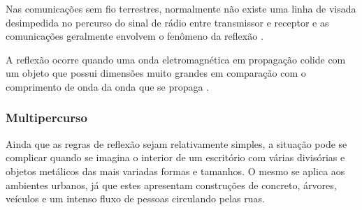 Nas comunicações sem fio terrestres, normalmente não existe uma linha de visada desimpedida no percurso do sinal de rádio entre transmissor e receptor e as comunicações geralmente envolvem o fenômeno da reflexão \cite{haykin2008}.

\begin{citacao}
	A reflexão ocorre quando uma onda eletromagnética em propagação colide com um objeto que possui dimensões muito grandes em comparação com o comprimento de onda da onda que se propaga  \cite{rappaport2009}.
\end{citacao}

\begin{figure}[H]
	\centering
\end{figure}

\subsubsection{Multipercurso}
\label{subsec:multipercurso}

Ainda que as regras de reflexão sejam relativamente simples, a situação pode se complicar quando se imagina o interior de um escritório com várias divisórias e objetos metálicos das mais variadas formas e tamanhos. O mesmo se aplica aos ambientes urbanos, já que estes apresentam construções de concreto, árvores, veículos e um intenso fluxo de pessoas circulando pelas ruas.

